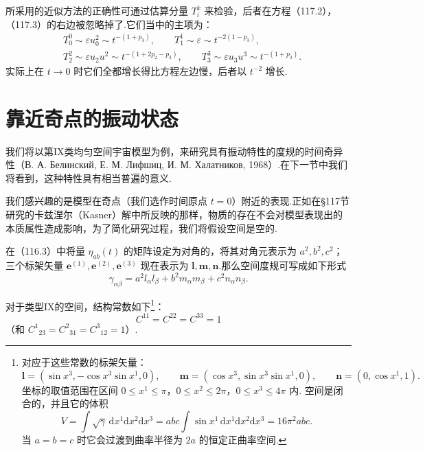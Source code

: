 \begin{xiti}
所采用的近似方法的正确性可通过估算分量 $T_{i}^{k}$ 来检验，后者在方程（117.2），（117.3）的右边被忽略掉了.它们当中的主项为：
\begin{equation*}
  \begin{aligned}
    &T_{0}^{0}\sim\varepsilon u_{0}^{2}\sim t^{-(1+p_{3})},\qquad
    T_{1}^{1}\sim\varepsilon\sim t^{-2(1-p_{3})},\\
    &T_{2}^{2}\sim\varepsilon u_{2}u^{2}\sim t^{-(1+2p_{2}-p_{3})},\qquad
    T_{3}^{3}\sim\varepsilon u_{3}u^{3}\sim t^{-(1+p_{3})}.
  \end{aligned}
\end{equation*}
实际上在 $t\to0$ 时它们全都增长得比方程左边慢，后者以 $t^{-2}$ 增长.

\end{xiti}

\section{靠近奇点的振动状态}

我们将以第IX类均匀空间宇宙模型为例，来研究具有振动特性的度规的时间奇异性（В. А. Белинский, Е. М. Лифшиц, И. М. Халатников, 1968）.在下一节中我们将看到，这种特性具有相当普遍的意义.

我们感兴趣的是模型在奇点（我们选作时间原点 $t=0$）附近的表现.正如在§117节研究的卡兹涅尔（Kasner）解中所反映的那样，物质的存在不会对模型表现出的本质属性造成影响，为了简化研究过程，我们将假设空间是空的.

在（116.3）中将量 $\eta_{ab}(t)$ 的矩阵设定为对角的，将其对角元表示为 $a^{2},b^{2},c^{2}$；三个标架矢量 $\boldsymbol{e}^{(1)},\boldsymbol{e}^{(2)},\boldsymbol{e}^{(3)}$ 现在表示为 $\boldsymbol{l},\boldsymbol{m},\boldsymbol{n}$.那么空间度规可写成如下形式
\begin{equation}
  \gamma_{\alpha\beta}
  =a^{2}l_{\alpha}l_{\beta}
  +b^{2}m_{\alpha}m_{\beta}
  +c^{2}n_{\alpha}n_{\beta}.
\end{equation}

对于类型IX的空间，结构常数如下\footnote{对应于这些常数的标架矢量：
\[
\boldsymbol{l}=(\sin x^{3},-\cos x^{3}\sin x^{1},0),\qquad
\boldsymbol{m}=(\cos x^{3},\sin x^{3}\sin x^{1},0),\qquad
\boldsymbol{n}=(0,\cos x^{1},1).
\]
坐标的取值范围在区间 $0\leqslant x^{1}\leqslant\pi$，$0\leqslant x^{2}\leqslant2\pi$，$0\leqslant x^{3}\leqslant4\pi$ 内. 空间是闭合的，并且它的体积
\[
V=\int\sqrt{\gamma}\,\mathrm{d}x^{1}\mathrm{d}x^{2}\mathrm{d}x^{3}
=abc\int\sin x^{1}\,\mathrm{d}x^{1}\mathrm{d}x^{2}\mathrm{d}x^{3}
=16\pi^{2}abc.
\]
当 $a=b=c$ 时它会过渡到曲率半径为 $2a$ 的恒定正曲率空间.}：
\begin{equation}
  C^{11}=C^{22}=C^{33}=1
\end{equation}
（和 $C^{1}{}_{23}=C^{2}{}_{31}=C^{3}{}_{12}=1$）.

